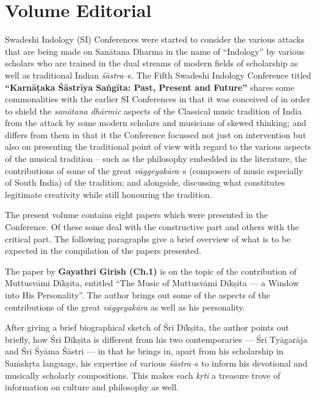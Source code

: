 
\chapter*{Volume Editorial}\label{volumeeditorial}

Swadeshi Indology (SI) Conferences were started to consider the various attacks that are being made on Sanātana Dharma in the name of “Indology” by various scholars who are trained in the dual streams of modern fields of scholarship as well as traditional Indian \textit{śāstra}–s. The Fifth Swadeshi Indology Conference titled \textbf{“Karnāṭaka Śāstrīya Saṅgīta: Past, Present and Future”} shares some commonalities with the earlier SI Conferences in that it was conceived of in order to shield the \textit{sanātana dhārmic} aspects of the Classical music tradition of India from the attack by some modern scholars and musicians of skewed thinking; and differs from them in that it the Conference focussed not just on intervention but also on presenting the traditional point of view with regard to the various aspects of the musical tradition – such as the philosophy embedded in the literature, the contributions of some of the great \textit{vāggeyakāra}–s (composers of music especially of South India) of the tradition; and alongside, discussing what constitutes legitimate creativity while still honouring the tradition.

The present volume contains eight papers which were presented in the Conference. Of these some deal with the constructive part and others with the critical part. The following paragraphs give a brief overview of what is to be expected in the compilation of the papers presented.

\delimiter

The paper by \textbf{Gayathri Girish (Ch.1)} is on the topic of the contribution of Muttusvāmi Dīkṣita, entitled “The Music of Muttusvāmi Dīkṣita –– a Window into His Personality”. The author brings out some of the aspects of the contributions of the great \textit{vāggeyakāra} as well as his personality.

After giving a brief biographical sketch of Śrī Dīkṣita, the author points out briefly, how Śrī Dīkṣita is different from his two contemporaries –– Śrī Tyāgarāja and Śrī Śyāma Śāstri –– in that he brings in, apart from his scholarship in Saṁskṛta language, his expertise of various \textit{śāstra}–s to inform his devotional and musically scholarly compositions. This makes each \textit{kṛti} a treasure trove of information on culture and philosophy as well. 

